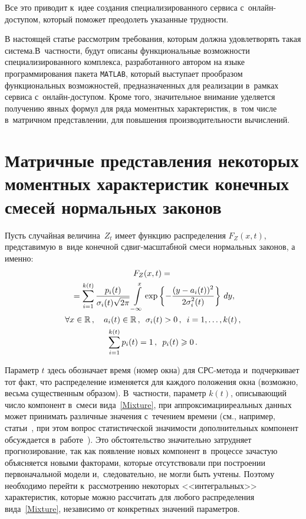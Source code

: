 \begin{multicols}{2}
Все это приводит к~идее 
создания специализированного сервиса с~он\-лайн-до\-сту\-пом, который поможет 
преодолеть указанные трудности.

В настоящей статье рассмотрим требования, которым должна удовлетворять такая 
система.\linebreak В~частности, будут описаны функциональные возможности специализированного 
комплекса, разработанного автором на языке программирования пакета \verb"MATLAB", 
который выступает прообразом функциональных возможностей, предназначенных для 
реализации в~рамках сервиса с~он\-лайн-до\-сту\-пом. Кроме того, значительное внимание 
уделяется получению явных формул для ряда моментных характеристик, в~том числе 
в~матричном представлении, для повышения производительности вычислений.

\section{Матричные представления некоторых моментных характеристик конечных 
смесей нормальных законов}

Пусть случайная величина~$Z_t$ имеет функцию распределения $F_Z(x,t)$, представимую 
в~виде конечной сдвиг-мас\-штаб\-ной смеси нормальных законов, а именно:
\begin{multline}
F_Z(x,t)={}\\
{}=\sum\limits_{i=1}^{k(t)}
\displaystyle\frac{\displaystyle p_i(t)\mathstrut}{\displaystyle \sigma_i(t)\sqrt{2\pi}\mathstrut}\int\limits_{-\infty}^{x}\exp
\left\{-\displaystyle\frac{\displaystyle (y-a_i(t))^2\mathstrut}{\displaystyle 2\sigma_i^2(t)\mathstrut}\right\}\,dy, 
\\
\forall x \in \mathbb{R}\,,\quad a_i(t)\in\mathbb{R}\,, \enskip \sigma_i(t)>0\,,\enskip 
i=1,\ldots,k(t)\,,\\ \sum\limits_{i=1}^{k(t)}p_{i}(t)=1\,, \enskip p_{i}(t)\geqslant 0\,.
\label{Mixture}
\end{multline}

Параметр $t$ здесь обозначает время (номер окна) для СРС-ме\-то\-да 
и~подчеркивает тот факт, что распределение изменяется для 
каждого положения окна (возможно, весьма существенным образом). 
В~частности, параметр $k(t)$, описывающий число компонент в~смеси 
вида~\eqref{Mixture}, при аппроксимации\linebreak реальных данных может принимать 
различные значения с~течением времени (см., например, 
\mbox{статьи}~\cite{Gorshenin2008,Gorshenin2012}, при этом вопрос статистической 
значимости дополнительных компонент обсуждается в~работе~\cite{Gorshenin2011b}). 
Это обстоятельство значительно затрудняет прогнозирование, так как появление 
новых компонент в~процессе зачастую объясняется новыми факторами, которые 
отсутствовали при построении первоначальной модели и,~следовательно, не могли быть 
учтены. Поэтому необходимо перейти к~рассмотрению некоторых <<интегральных>> 
характеристик, которые можно рассчитать для любого распределения вида~\eqref{Mixture}, 
независимо от конкретных значений параметров.


\end{multicols}
